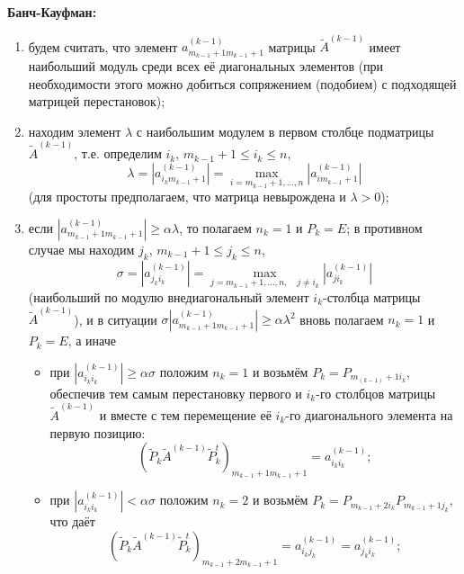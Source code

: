 \documentclass[a4paper, 12pt]{article}   	%
\begin{document}
\textbf{Банч-Кауфман:}
\begin{enumerate}
    \item будем считать, что элемент $a_{m_{k-1}+1m_{k-1}+1}^{(k-1)}$ матрицы $\widetilde{A}^{(k-1)}$ имеет наибольший модуль среди всех её диагональных элементов (при необходимости этого можно добиться сопряжением (подобием) с подходящей матрицей перестановок);

    \item находим элемент $\lambda$ с наибольшим модулем в первом столбце подматрицы $\widetilde{A}^{(k-1)}$, т.е. определим $i_k$, $m_{k-1} + 1 \leq i_k \leq n$,
    \begin{equation*}\label{part8}
        \lambda = |a_{i_k m_{k-1}+1}^{(k-1)}| = \max_{i = m_{k-1} + 1,..., n} | a_{i m_{k-1}+1}^{(k-1)}|
    \end{equation*}
    (для простоты предполагаем, что матрица невырождена и $\lambda > 0$);
    
    \item если $|a_{m_{k-1}+1m_{k-1}+1}^{(k-1)}| \geq \alpha \lambda$, то полагаем $n_k=1$ и $P_k = E$; в противном случае мы находим $j_k$, $m_{k-1} + 1 \leq j_k \leq n$,
    \begin{equation*}\label{part9}
        \sigma = |a_{j_k i_k}^{(k-1)}| = \max_{j = m_{k-1} + 1,...,n, \quad j \neq i_k} |a_{j i_k}^{(k-1)}|
    \end{equation*}
    (наибольший по модулю внедиагональный элемент $i_k$-столбца матрицы $\widetilde{A}^{(k-1)}$), и в ситуации $\sigma|a_{m_{k-1}+1m_{k-1}+1}^{(k-1)}| \geq \alpha \lambda^2$ вновь полагаем $n_k = 1$ и $P_k = E$, а иначе
    
    \begin{itemize}
        \item при $|a_{i_k i_k}^{(k-1)}| \geq \alpha \sigma$ положим $n_k=1$ и возьмём $P_k = P_{m_{(k-1)}+1 i_k}$, обеспечив тем самым перестановку первого и $i_k$-го столбцов матрицы $\widetilde{A}^{(k-1)}$ и вместе с тем перемещение её $i_k$-го диагонального элемента на первую позицию:
        \begin{equation*}\label{part10}
            (\widetilde{P}_k \widetilde{A}^{(k-1)} \widetilde{P}_k^t)_{m_{k-1}+1 m_{k-1}+1} = a_{i_k i_k}^{(k-1)};
        \end{equation*}
        
        \item при $|a_{i_k i_k}^{(k-1)}| < \alpha \sigma$ положим $n_k=2$ и возьмём $P_k = P_{m_{k-1}+2 i_k} P_{m_{k-1}+1 j_k}$, что даёт 
        \begin{equation*}\label{part11}
            (\widetilde{P}_k \widetilde{A}^{(k-1)} \widetilde{P}_k^t)_{m_{k-1}+2 m_{k-1}+1} = a_{i_k j_k}^{(k-1)} = a_{j_k i_k}^{(k-1)};
        \end{equation*}
    \end{itemize}
\end{enumerate}
\end{document}

